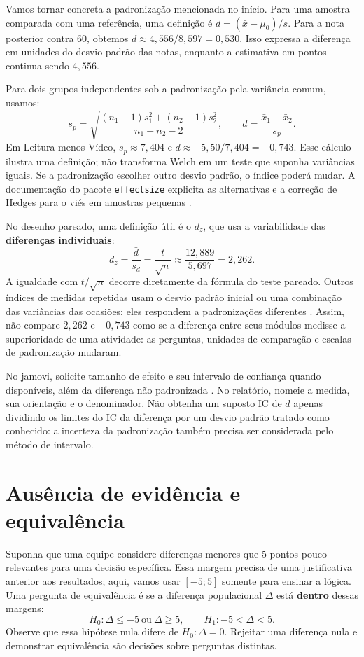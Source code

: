 Vamos tornar concreta a padronização mencionada no início. Para uma amostra comparada com uma referência, uma definição é $d=(\bar{x}-\mu_0)/s$. Para a nota posterior contra 60, obtemos $d\approx4{,}556/8{,}597=0{,}530$. Isso expressa a diferença em unidades do desvio padrão das notas, enquanto a estimativa em pontos continua sendo $4{,}556$.

Para dois grupos independentes sob a padronização pela variância comum, usamos:
\[
s_p=\sqrt{\frac{(n_1-1)s_1^2+(n_2-1)s_2^2}{n_1+n_2-2}},
\qquad d=\frac{\bar{x}_1-\bar{x}_2}{s_p}.
\]
Em Leitura menos Vídeo, $s_p\approx7{,}404$ e $d\approx-5{,}50/7{,}404=-0{,}743$. Esse cálculo ilustra uma definição; não transforma Welch em um teste que suponha variâncias iguais. Se a padronização escolher outro desvio padrão, o índice poderá mudar. A documentação do pacote \texttt{effectsize} explicita as alternativas e a correção de Hedges para o viés em amostras pequenas \parencite{EffectsizeD}.

No desenho pareado, uma definição útil é o $d_z$, que usa a variabilidade das \textbf{diferenças individuais}:
\[
d_z=\frac{\bar d}{s_d}=\frac{t}{\sqrt n}
\approx\frac{12{,}889}{5{,}697}=2{,}262.
\]
A igualdade com $t/\sqrt n$ decorre diretamente da fórmula do teste pareado. Outros índices de medidas repetidas usam o desvio padrão inicial ou uma combinação das variâncias das ocasiões; eles respondem a padronizações diferentes \parencite{EffectsizePareado}. Assim, não compare $2{,}262$ e $-0{,}743$ como se a diferença entre seus módulos medisse a superioridade de uma atividade: as perguntas, unidades de comparação e escalas de padronização mudaram.

No jamovi, solicite tamanho de efeito e seu intervalo de confiança quando disponíveis, além da diferença não padronizada \parencite{JamoviTIndependente,JamoviTPareado}. No relatório, nomeie a medida, sua orientação e o denominador. Não obtenha um suposto IC de $d$ apenas dividindo os limites do IC da diferença por um desvio padrão tratado como conhecido: a incerteza da padronização também precisa ser considerada pelo método de intervalo.

\section{Ausência de evidência e equivalência}
\label{sec:equivalencia}

Suponha que uma equipe considere diferenças menores que 5 pontos pouco relevantes para uma decisão específica. Essa margem precisa de uma justificativa anterior aos resultados; aqui, vamos usar $[-5;5]$ somente para ensinar a lógica. Uma pergunta de equivalência é se a diferença populacional $\Delta$ está \textbf{dentro} dessas margens:
\[
H_0:\Delta\leq-5\ \text{ou}\ \Delta\geq5,
\qquad H_1:-5<\Delta<5.
\]
Observe que essa hipótese nula difere de $H_0:\Delta=0$. Rejeitar uma diferença nula e demonstrar equivalência são decisões sobre perguntas distintas.

